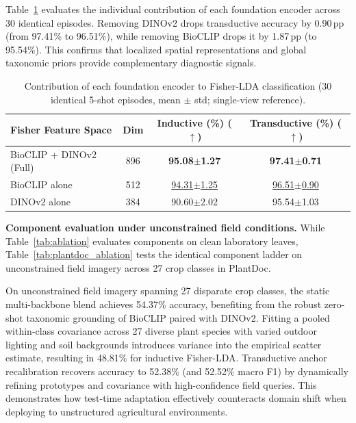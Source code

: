 \documentclass[preprint,12pt]{elsarticle}
\begin{document}
Table~\ref{tab:feature_ablation} evaluates the individual contribution of each foundation encoder across 30 identical episodes. Removing DINOv2 drops transductive accuracy by 0.90\,pp (from 97.41\% to 96.51\%), while removing BioCLIP drops it by 1.87\,pp (to 95.54\%). This confirms that localized spatial representations and global taxonomic priors provide complementary diagnostic signals.

\begin{table}[htbp]
\caption{Contribution of each foundation encoder to Fisher-LDA classification (30 identical 5-shot episodes, mean $\pm$ std; single-view reference).}
\label{tab:feature_ablation}
\centering

\footnotesize
\setlength{\tabcolsep}{4pt}
\begin{tabular*}{\columnwidth}{@{\extracolsep{\fill}}lccc}
\toprule
\textbf{Fisher Feature Space} & \textbf{Dim} & \textbf{Inductive (\%) ($\uparrow$)} & \textbf{Transductive (\%) ($\uparrow$)} \\
\midrule
BioCLIP + DINOv2 (Full) & 896 & \textbf{95.08$\pm$1.27} & \textbf{97.41$\pm$0.71} \\
BioCLIP alone & 512 & \underline{94.31$\pm$1.25} & \underline{96.51$\pm$0.90} \\
DINOv2 alone & 384 & 90.60$\pm$2.02 & 95.54$\pm$1.03 \\
\bottomrule
\end{tabular*}
\end{table}

\textbf{Component evaluation under unconstrained field conditions.} While Table~\ref{tab:ablation} evaluates components on clean laboratory leaves, Table~\ref{tab:plantdoc_ablation} tests the identical component ladder on unconstrained field imagery across 27 crop classes in PlantDoc.

On unconstrained field imagery spanning 27 disparate crop classes, the static multi-backbone blend achieves 54.37\% accuracy, benefiting from the robust zero-shot taxonomic grounding of BioCLIP paired with DINOv2. Fitting a pooled within-class covariance across 27 diverse plant species with varied outdoor lighting and soil backgrounds introduces variance into the empirical scatter estimate, resulting in 48.81\% for inductive Fisher-LDA. Transductive anchor recalibration recovers accuracy to 52.38\% (and 52.52\% macro F1) by dynamically refining prototypes and covariance with high-confidence field queries. This demonstrates how test-time adaptation effectively counteracts domain shift when deploying to unstructured agricultural environments.
\end{document}
